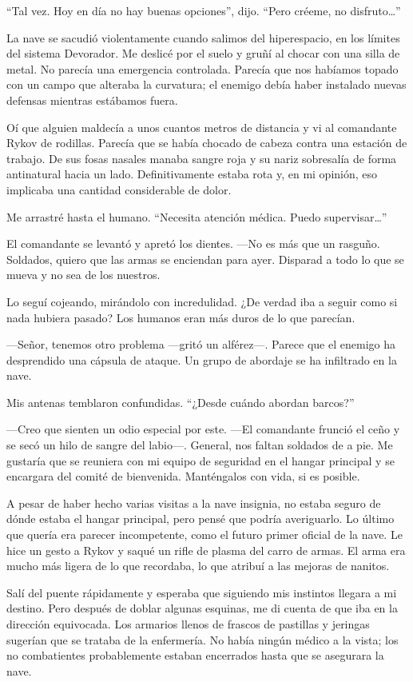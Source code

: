 ``Tal vez. Hoy en día no hay buenas opciones'', dijo. ``Pero créeme, no disfruto…''


La nave se sacudió violentamente cuando salimos del hiperespacio, en los límites del sistema Devorador. Me deslicé por el suelo y gruñí al chocar con una silla de metal. No parecía una emergencia controlada. Parecía que nos habíamos topado con un campo que alteraba la curvatura; el enemigo debía haber instalado nuevas defensas mientras estábamos fuera.

Oí que alguien maldecía a unos cuantos metros de distancia y vi al comandante Rykov de rodillas. Parecía que se había chocado de cabeza contra una estación de trabajo. De sus fosas nasales manaba sangre roja y su nariz sobresalía de forma antinatural hacia un lado. Definitivamente estaba rota y, en mi opinión, eso implicaba una cantidad considerable de dolor.

Me arrastré hasta el humano. ``Necesita atención médica. Puedo supervisar…''


El comandante se levantó y apretó los dientes. —No es más que un rasguño. Soldados, quiero que las armas se enciendan para ayer. Disparad a todo lo que se mueva y no sea de los nuestros.

Lo seguí cojeando, mirándolo con incredulidad. ¿De verdad iba a seguir como si nada hubiera pasado? Los humanos eran más duros de lo que parecían.

—Señor, tenemos otro problema —gritó un alférez—. Parece que el enemigo ha desprendido una cápsula de ataque. Un grupo de abordaje se ha infiltrado en la nave.

Mis antenas temblaron confundidas. ``¿Desde cuándo abordan barcos?''


—Creo que sienten un odio especial por este. —El comandante frunció el ceño y se secó un hilo de sangre del labio—. General, nos faltan soldados de a pie. Me gustaría que se reuniera con mi equipo de seguridad en el hangar principal y se encargara del comité de bienvenida. Manténgalos con vida, si es posible.

A pesar de haber hecho varias visitas a la nave insignia, no estaba seguro de dónde estaba el hangar principal, pero pensé que podría averiguarlo. Lo último que quería era parecer incompetente, como el futuro primer oficial de la nave. Le hice un gesto a Rykov y saqué un rifle de plasma del carro de armas. El arma era mucho más ligera de lo que recordaba, lo que atribuí a las mejoras de nanitos.

Salí del puente rápidamente y esperaba que siguiendo mis instintos llegara a mi destino. Pero después de doblar algunas esquinas, me di cuenta de que iba en la dirección equivocada. Los armarios llenos de frascos de pastillas y jeringas sugerían que se trataba de la enfermería. No había ningún médico a la vista; los no combatientes probablemente estaban encerrados hasta que se asegurara la nave.

